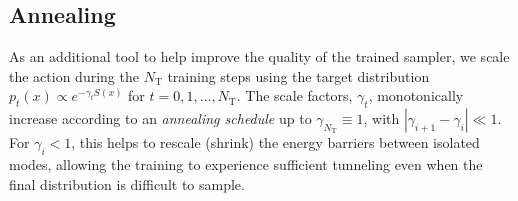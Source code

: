 \documentclass[a4paper,11pt]{article}
\begin{document}
\subsection{\label{subsec:annealing}Annealing}
As an additional tool to help improve the quality of the trained sampler, we
scale the action during the $N_{\mathrm{T}}$ training steps using the target
distribution \(p_{t}(x) \propto e^{-\gamma_{t} S(x)}\) for \(t = 0, 1, \ldots,
N_{\mathrm{T}}\).
%
The scale factors, $\gamma_{t}$, monotonically increase according to an
\emph{annealing schedule} up to $\gamma_{N_{\mathrm{T}}} \equiv 1$, with
\(|\gamma_{i+1} - \gamma_{i}| \ll 1\).
%
For \(\gamma_i < 1\), this helps to rescale (shrink) the energy barriers
between isolated modes, allowing the training to experience sufficient
tunneling even when the final distribution is difficult to sample.
%
\clearpage
\end{document}
